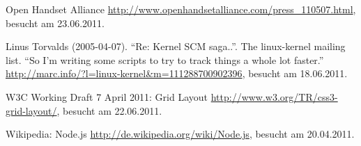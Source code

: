 \begin{thebibliography}{99}
  Open Handset Alliance
    \url{http://www.openhandsetalliance.com/press_110507.html}, besucht am 23.06.2011.

	Linus Torvalds (2005-04-07).
	``Re: Kernel SCM saga..''.
	The linux-kernel mailing list. ``So I'm writing some scripts to try to track
	things a whole lot faster.''
	\url{http://marc.info/?l=linux-kernel&m=111288700902396}, besucht am 18.06.2011.

	W3C Working Draft 7 April 2011:
	Grid Layout
	\url{http://www.w3.org/TR/css3-grid-layout/}, besucht am 22.06.2011.

  Wikipedia: Node.js
    \url{http://de.wikipedia.org/wiki/Node.js}, besucht am 20.04.2011.
	
\end{thebibliography}